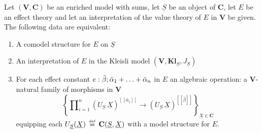 \documentclass{LMCS}
\newcommand{\comptype}[1]{\underline{#1}}
\newcommand{\algX}{{\comptype{X}}}
\renewcommand{\vec}[1]{\bar{#1}}
\DeclareMathOperator{\Prod}{\textstyle{\prod}}
\newcommand{\VCat}{\fixedcatfont{V}} \newcommand{\CCat}{\fixedcatfont{C}} \newcommand{\DCat}{\fixedcatfont{D}}
\newcommand{\fixedcatfont}{\mathbf}
\newcommand{\denlb}{[\![}
\newcommand{\denrb}{]\!]}
\newcommand{\den}[1]{\denlb{#1}\denrb}
\newcommand{\stateobj}{{\underline{S}}}
\newcommand{\KlCat}[3]{\mathbf{Kl}_{#3}} \newcommand{\Klltensor}[2]{#1 \cdot_{\mathbf{Kl}} #2}
\newcommand{\defeq}{\mathrel{\,\stackrel{\mbox{\tiny{$\mathrm{def}$}}}=\,}}
\begin{document}
\begin{thm}
\label{thm:correspondence:thm}
Let $(\VCat,\CCat)$ be an enriched model with sums, let $\stateobj$ be an object
of $\CCat$, let $E$ be an effect theory and let an interpretation of the value theory of $E$ in $\VCat$ 
be given. 
The following data are equivalent:
\begin{enumerate}
\item \label{item:comodel} A comodel structure for $E$ on $\stateobj$
\item \label{item:Kleisli:model} An interpretation of $E$ in the Kleisli model $(\VCat, \KlCat{\VCat}{\CCat}{\stateobj}, J_{\stateobj})$ 
\item \label{item:alg:op:model} For each effect constant $\arityj{\geff}{\vec\beta}{\vec \alpha_1 + \ldots + \vec \alpha_n}$ in $E$ an algebraic operation:
a $\VCat$-natural family of morphisms in $\VCat$
\[\left\{\Prod_{i=1}^n {(U_\stateobj\,\algX)^{\den{\vec\alpha_i}}}\to (U_\stateobj\,\algX)^{\den{\vec\beta}}\right\}_{\algX\in\CCat}\]
equipping each $U_\stateobj(\algX)\defeq \CCat(\stateobj,\algX)$ with a model structure for $E$.
\end{enumerate}
\end{thm}
\end{document}
